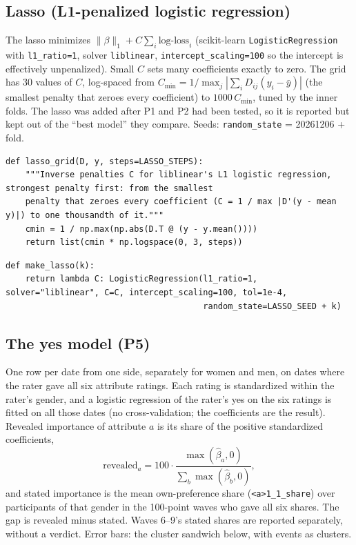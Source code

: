 \documentclass[11pt]{article}
\begin{document}
\subsection{Lasso (L1-penalized logistic regression)}

The lasso minimizes $\|\beta\|_1 + C \sum_i \text{log-loss}_i$ (scikit-learn \texttt{LogisticRegression} with
\texttt{l1\_ratio=1}, solver \texttt{liblinear}, \texttt{intercept\_scaling=100} so the intercept is effectively
unpenalized). Small $C$ sets many coefficients exactly to zero. The grid has 30 values of $C$,
log-spaced from $C_{\min} = 1/\max_j |\sum_i D_{ij}(y_i - \bar y)|$ (the smallest penalty that zeroes every
coefficient) to $1000\,C_{\min}$, tuned by the inner folds. The lasso was added after P1 and P2 had been tested, so it
is reported but kept out of the ``best model'' they compare. Seeds: \texttt{random\_state} = 20261206 + fold.

\begin{lstlisting}[caption={The lasso penalty grid (scripts/part1\_models.py)}]
def lasso_grid(D, y, steps=LASSO_STEPS):
    """Inverse penalties C for liblinear's L1 logistic regression, strongest penalty first: from the smallest
    penalty that zeroes every coefficient (C = 1 / max |D'(y - mean y)|) to one thousandth of it."""
    cmin = 1 / np.max(np.abs(D.T @ (y - y.mean())))
    return list(cmin * np.logspace(0, 3, steps))
\end{lstlisting}

\begin{lstlisting}[caption={Lasso (scripts/part1\_models.py)}]
def make_lasso(k):
    return lambda C: LogisticRegression(l1_ratio=1, solver="liblinear", C=C, intercept_scaling=100, tol=1e-4,
                                        random_state=LASSO_SEED + k)
\end{lstlisting}

\subsection{The yes model (P5)}

One row per date from one side, separately for women and men, on dates where the rater gave all six attribute
ratings. Each rating is standardized within the rater's gender, and a logistic regression of the rater's yes on the
six ratings is fitted on all those dates (no cross-validation; the coefficients are the result). Revealed importance
of attribute $a$ is its share of the positive standardized coefficients,
\[
\text{revealed}_a = 100 \cdot \frac{\max(\hat\beta_a, 0)}{\sum_b \max(\hat\beta_b, 0)},
\]
and stated importance is the mean own-preference share (\texttt{<a>1\_1\_share}) over participants of that gender in
the 100-point waves who gave all six shares. The gap is revealed minus stated. Waves 6--9's stated shares are
reported separately, without a verdict. Error bars: the cluster sandwich below, with events as clusters.
\end{document}
